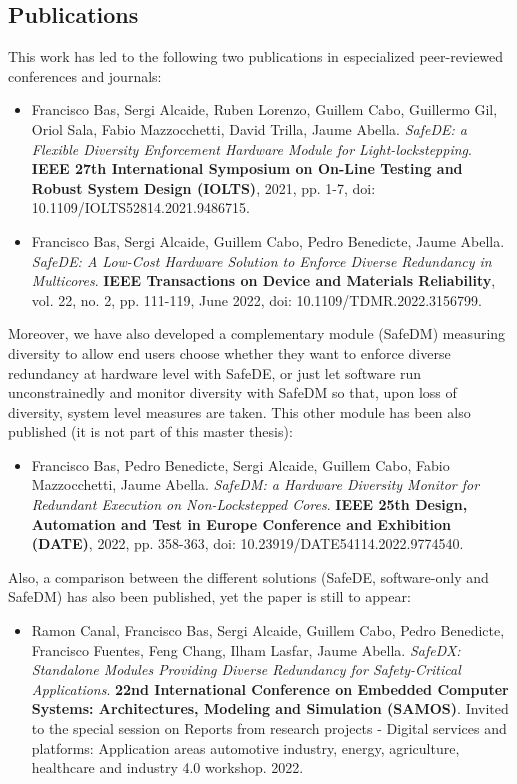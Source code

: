 \subsection{Publications}

This work has led to the following two publications in especialized peer-reviewed conferences and journals:

\begin{itemize}
\item 
Francisco Bas, Sergi Alcaide, Ruben Lorenzo, Guillem Cabo, Guillermo Gil, Oriol Sala, Fabio Mazzocchetti, David Trilla, Jaume Abella.
\emph{SafeDE: a Flexible Diversity Enforcement Hardware Module for Light-lockstepping}. 
\textbf{IEEE 27th International Symposium on On-Line Testing and Robust System Design (IOLTS)}, 2021, pp. 1-7, doi: 10.1109/IOLTS52814.2021.9486715.

\item
Francisco Bas, Sergi Alcaide, Guillem Cabo, Pedro Benedicte, Jaume Abella.
\emph{SafeDE: A Low-Cost Hardware Solution to Enforce Diverse Redundancy in Multicores}.
\textbf{IEEE Transactions on Device and Materials Reliability}, vol. 22, no. 2, pp. 111-119, June 2022, doi: 10.1109/TDMR.2022.3156799.
\end{itemize}

Moreover, we have also developed a complementary module (SafeDM) measuring diversity to allow end users choose whether they want to enforce diverse redundancy at hardware level with SafeDE, or just let software run unconstrainedly and monitor diversity with SafeDM so that, upon loss of diversity, system level measures are taken.
This other module has been also published (it is not part of this master thesis):

\begin{itemize}
\item 
Francisco Bas, Pedro Benedicte, Sergi Alcaide, Guillem Cabo, Fabio Mazzocchetti, Jaume Abella.
\emph{SafeDM: a Hardware Diversity Monitor for Redundant Execution on Non-Lockstepped Cores}.
\textbf{IEEE 25th Design, Automation and Test in Europe Conference and Exhibition (DATE)}, 2022, pp. 358-363, \linebreak doi: 10.23919/DATE54114.2022.9774540.
\end{itemize}

Also, a comparison between the different solutions (SafeDE, software-only and SafeDM) has also been published, yet the paper is still to appear:
\begin{itemize}
\item 
Ramon Canal, Francisco Bas, Sergi Alcaide, Guillem Cabo, Pedro Benedicte, Francisco Fuentes, Feng Chang, Ilham Lasfar, Jaume Abella.
\emph{SafeDX: Standalone Modules Providing Diverse Redundancy for Safety-Critical Applications}.
\textbf{22nd International Conference on Embedded Computer Systems: Architectures, Modeling and Simulation (SAMOS)}. Invited to the special session on Reports from research projects - Digital services and platforms: Application areas automotive industry, energy, agriculture, healthcare and industry 4.0 workshop. 2022.
\end{itemize}


